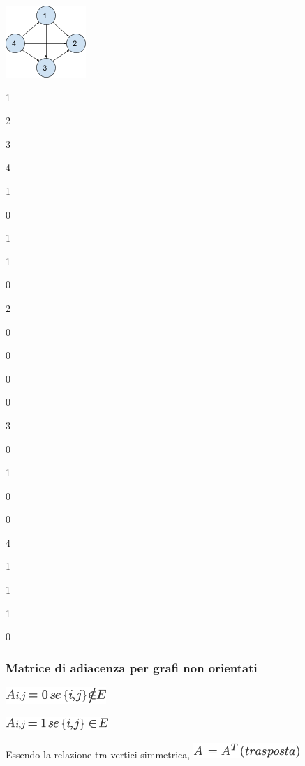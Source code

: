 \documentclass{article}
\begin{document}
{}

\protect\hypertarget{t.baa371c993d5b7baad0f4dd74d8432f916b9230a}{}{}\protect\hypertarget{t.37}{}{}

{\includegraphics{images/image529.png}}

{}

{1}

{2}

{3}

{4}

{1}

{0}

{1}

{1}

{0}

{2}

{0}

{0}

{0}

{0}

{3}

{0}

{1}

{0}

{0}

{4}

{1}

{1}

{1}

{0}

{}

\hypertarget{h.iuwxcos21awu}{\subsubsection{\texorpdfstring{{Matrice di
adiacenza per grafi non
orientati}}{Matrice di adiacenza per grafi non orientati}}\label{h.iuwxcos21awu}}

\includegraphics{images/image388.png}

\includegraphics{images/image389.png}

{Essendo la relazione tra vertici simmetrica,
}\includegraphics{images/image390.png}
\end{document}
